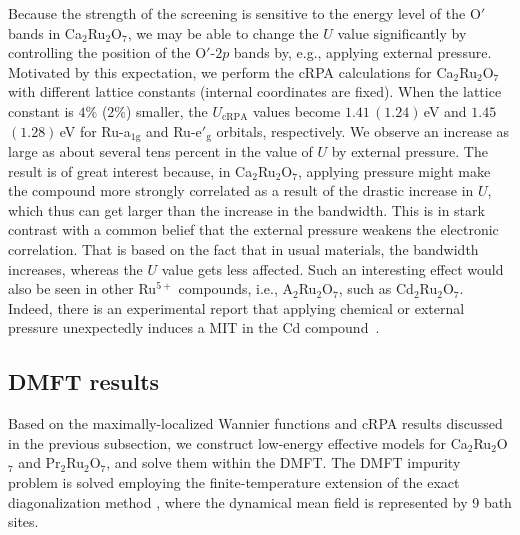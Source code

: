 \documentclass[10pt]{iopart}
\begin{document}
Because the strength of the screening is sensitive to the energy level of the O$'$ bands in Ca$_2$Ru$_2$O$_7$, we may be able to change the $U$ value significantly by controlling the position of the O$'$-$2p$ bands by, e.g., applying external pressure. 
Motivated by this expectation, we perform the cRPA calculations for Ca$_2$Ru$_2$O$_7$ with different lattice constants (internal coordinates are fixed). 
When the lattice constant is $4 \%$ ($2 \%$) smaller, the $U_{\mathrm{cRPA}}$ values become $1.41\,(1.24)\,$eV and $1.45$ $(1.28)\,$eV for Ru-a$_{1\mathrm{g}}$ and Ru-e$'_{\mathrm{g}}$ orbitals, respectively. 
We observe an increase as large as about several tens percent in the value of $U$ by external pressure. 
The result is of great interest because, in Ca$_2$Ru$_2$O$_7$, applying pressure might make the compound more strongly correlated as a result of the drastic increase in $U$, which thus can get larger than the increase in the bandwidth. 
This is in stark contrast with a common belief that the external pressure weakens the electronic correlation. That is based on the fact that in usual materials, the bandwidth increases, whereas the $U$ value gets less affected. 
Such an interesting effect would also be seen in other Ru$^{5+}$ compounds, i.e., A$_2$Ru$_2$O$_7$, such as Cd$_2$Ru$_2$O$_7$. 
Indeed, there is an experimental report that applying chemical or external pressure unexpectedly induces a MIT in the Cd compound~\cite{jiao2018effect}. 


\subsection{DMFT results}
\label{sec:DMFT}

Based on the maximally-localized Wannier functions and cRPA results discussed in the previous subsection, we construct low-energy effective models for Ca$_2$Ru$_2$O$_7$ and Pr$_2$Ru$_2$O$_7$, and solve them within the DMFT.
The DMFT impurity problem is solved employing the finite-temperature extension \cite{capone2007,liebsch2012} of the exact diagonalization method \cite{caffarel1994}, where the dynamical mean field is represented by 9 bath sites.
\end{document}
